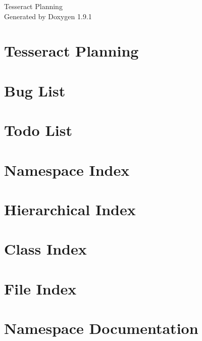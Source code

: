 \let\mypdfximage\pdfximage\def\pdfximage{\immediate\mypdfximage}\documentclass[twoside]{book}
\newcommand{\+}{\discretionary{\mbox{\scriptsize$\hookleftarrow$}}{}{}}
\newcommand{\clearemptydoublepage}{%
  \newpage{\pagestyle{empty}\cleardoublepage}%
}
\begin{document}
\raggedbottom

\hypersetup{pageanchor=false,
             bookmarksnumbered=true,
             pdfencoding=unicode
            }
\begin{titlepage}
\vspace*{7cm}
\begin{center}%
{\Large Tesseract Planning }\\
\vspace*{1cm}
{\large Generated by Doxygen 1.9.1}\\
\end{center}
\end{titlepage}
\clearemptydoublepage
{}
\tableofcontents
\clearemptydoublepage
{}
\hypersetup{pageanchor=true}

\chapter{Tesseract Planning}
\label{index}\hypertarget{index}{}
\chapter{Bug List}
\label{bug}

\chapter{Todo List}
\label{todo}

\chapter{Namespace Index}

\chapter{Hierarchical Index}

\chapter{Class Index}

\chapter{File Index}

\chapter{Namespace Documentation}












\end{document}
